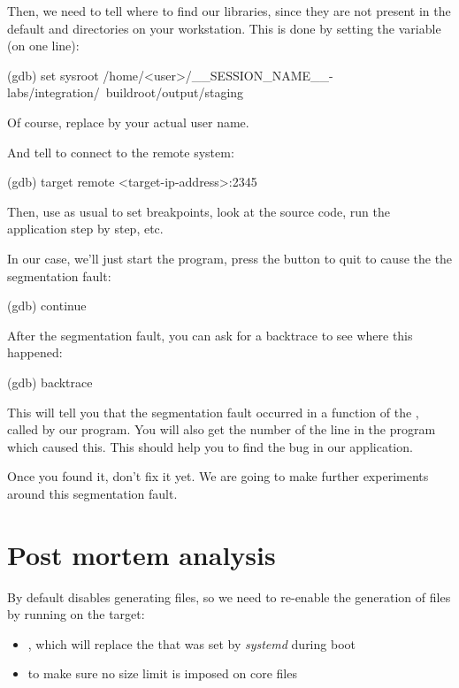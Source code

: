 Then, we need to tell where to find our libraries, since they are not
present in the default  and  directories on
your workstation. This is done by setting the  
variable (on one line):

\begin{bashinput}
(gdb) set sysroot /home/<user>/__SESSION_NAME__-labs/integration/\
    buildroot/output/staging
\end{bashinput}

Of course, replace  by your actual user name.

And tell  to connect to the remote system:
\begin{bashinput}
(gdb) target remote <target-ip-address>:2345
\end{bashinput}

Then, use  as usual to set breakpoints, look at the source
code, run the application step by step, etc.

In our case, we'll just start the program, press the  button
to quit to cause the the segmentation fault:
\begin{bashinput}
(gdb) continue
\end{bashinput}

After the segmentation fault, you can ask for a backtrace to see
where this happened:
\begin{bashinput}
(gdb) backtrace
\end{bashinput}

This will tell you that the segmentation fault occurred in a function
of the \code{libmpdclient}, called by our program. You will also get
the number of the line in the program which caused this. This should
help you to find the bug in our application.

Once you found it, don't fix it yet. We are going to make further
experiments around this segmentation fault.

\section{Post mortem analysis}

By default  disables generating  files, so we
need to re-enable the generation of \code{core} files by running on
the target:

\begin{itemize}

\item {}, which will
  replace the \inlinebash{|/bin/false} that was set by {\em systemd}
  during boot

\item {} to make sure no size limit is
  imposed on core files

\end{itemize}

